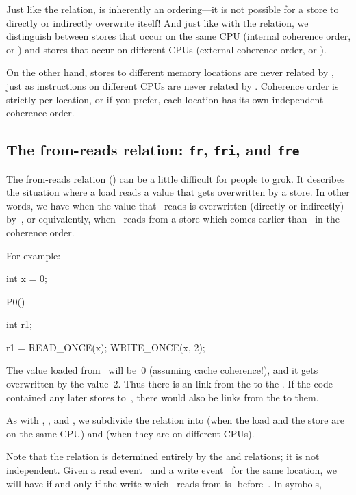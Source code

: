 Just like the  relation,  is inherently an
ordering---it is not possible for a store to directly or indirectly
overwrite itself!
And just like with the  relation, we distinguish between stores that
occur on the same CPU (internal coherence order, or ) and stores
that occur on different CPUs (external coherence order, or ).

On the other hand, stores to different memory locations are never
related by , just as instructions on different CPUs are never
related by .
Coherence order is strictly per-location, or if you prefer, each
location has its own independent coherence order.


\subsection{The from-reads relation: \texttt{fr}, \texttt{fri}, and \texttt{fre}}
\label{sec:docs:explanation:The from-reads relation: fr, fri, and fre}

The from-reads relation () can be a little difficult for people to
grok.
It describes the situation where a load reads a value that gets
overwritten by a store.
In other words, we have  when the value that ~reads
is overwritten (directly or indirectly) by~, or equivalently,
when ~reads from a store which comes earlier than~ in
the coherence order.

For example:

\begin{VerbatimU}
	int x = 0;

	P0()
	{
		int r1;

		r1 = READ_ONCE(x);
		WRITE_ONCE(x, 2);
	}
\end{VerbatimU}

The value loaded from~ will be~0 (assuming cache coherence{!}), and it
gets overwritten by the value~2.
Thus there is an  link from the  to the
.
If the code contained any later stores to~, there would also be
 links from the  to them.

As with , , and , we subdivide the  relation
into  (when the load and the store are on the same CPU) and
 (when they are on different CPUs).

Note that the  relation is determined entirely by the  and
 relations; it is not independent.
Given a read event~ and a write event~ for the same
location, we will have  if and only if the write
which ~reads from is -before~.
In symbols,

